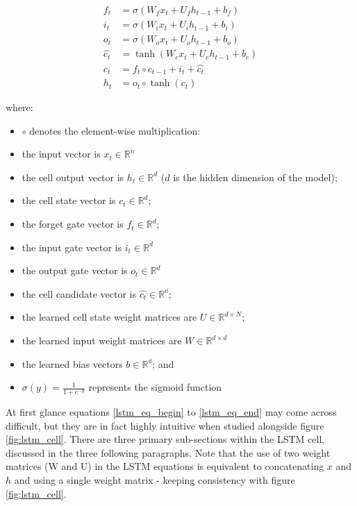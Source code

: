 \begin{align}
    f_t & = \sigma(W_f x_t + U_f h_{t-1} + b_f) \label{lstm_eq_begin}\\
    i_t & = \sigma(W_i x_t + U_i h_{t-1} + b_i) \\
    o_t & = \sigma(W_o x_t + U_o h_{t-1} + b_o) \\
    \hat{c_t} & = \tanh(W_c x_t + U_c h_{t-1} + b_c) \\
    c_t & = f_t \circ c_{t-1} + i_t + \hat{c_t} \\
    h_t & = o_t \circ \tanh(c_t) \label{lstm_eq_end}
\end{align}

where:
\begin{itemize}
    \item $\circ$ denotes the element-wise multiplication:
    \item the input vector is $x_t \in \mathbb{R}^n$
    \item the cell output vector is $h_t \in \mathbb{R}^d$ ($d$ is the hidden dimension of the model);
    \item the cell state vector is $c_t \in \mathbb{R}^d$;
    \item the forget gate vector is $f_t \in \mathbb{R}^d$;
    \item the input gate vector is $i_t \in \mathbb{R}^d$
    \item the output gate vector is $o_t \in \mathbb{R}^d$
    \item the cell candidate vector is $\hat{c_t} \in \mathbb{R^d}$;
    \item the learned cell state weight matrices are $U \in \mathbb{R}^{d \times N}$;
    \item the learned input weight matrices are $W \in \mathbb{R}^{d \times d}$
    \item the learned bias vectors $b \in \mathbb{R^d}$; and
    \item $\sigma(y)=\frac{1}{1+e^{-y}}$ represents the sigmoid function
\end{itemize}

At first glance equations \ref{lstm_eq_begin} to \ref{lstm_eq_end} may come across difficult, but they are in fact highly intuitive when studied alongside figure \ref{fig:lstm_cell}. There are three primary sub-sections within the LSTM cell, discussed in the three following paragraphs. Note that the use of two weight matrices (W and U) in the LSTM equations is equivalent to concatenating $x$ and $h$ and using a single weight matrix - keeping consistency with figure \ref{fig:lstm_cell}. 

